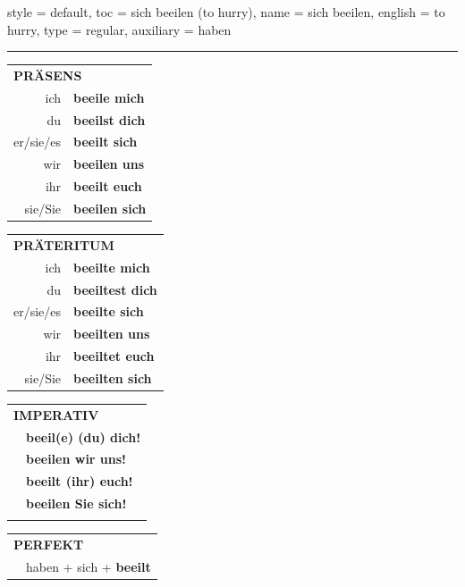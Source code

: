 \begin{verbentry}{
  style = {default},
  toc = {sich beeilen (to hurry)},
  name = {sich beeilen},
  english = {to hurry},
  type = {regular},
  auxiliary = {haben}
}
 
    
       \vspace{5pt}

    \hrule
    
    \vspace{5pt}

  \begin{tabular}{rl}
     \multicolumn{2}{l}{\textbf{PRÄSENS} }\\
    ich & \textbf{beeile mich}\\
    du & \textbf{beeilst dich}\\
    er/sie/es & \textbf{beeilt sich}\\
    wir & \textbf{beeilen uns}\\
    ihr & \textbf{beeilt euch}\\
    sie/Sie & \textbf{beeilen sich}\\
  \end{tabular}
  \hfill
     \begin{tabular}{rl}
    \multicolumn{2}{l}{\textbf{PRÄTERITUM} }\\
    ich & \textbf{beeilte mich}\\
    du & \textbf{beeiltest dich}\\
    er/sie/es & \textbf{beeilte sich}\\
    wir & \textbf{beeilten uns}\\
    ihr & \textbf{beeiltet euch}\\
    sie/Sie & \textbf{beeilten sich}\\
  \end{tabular}
  \hfill
  \begin{tabular}{rl}
     \multicolumn{2}{l}{\textbf{IMPERATIV} }\\
   & \textbf{beeil(e) (du) dich!}\\
   & \textbf{beeilen wir uns!}\\
   & \textbf{beeilt (ihr) euch!}\\
   & \textbf{beeilen Sie sich!}\\
   & \vspace{10pt}
  \end{tabular}

    \vspace{10pt}

 \begin{tabular}{rl}
     \multicolumn{2}{l}{\textbf{PERFEKT}}\\
    &haben + sich + \textbf{beeilt}\\
  \end{tabular}
\hfill
   \begin{tabular}{rl}
   

\end{tabular}
\end{verbentry}
